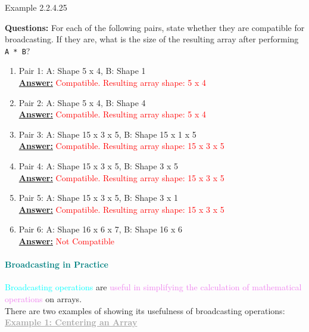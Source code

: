 \documentclass{book}
\begin{document}
\newpage
\begin{egBox}{Example 2.2.4.25}
    \raggedright
    \raggedright
    \textbf{Questions:} For each of the following pairs, state whether they are compatible for broadcasting. If they are, what is the size of the resulting array after performing \texttt{A * B}?\\

    \begin{enumerate}
        \item Pair 1: A: Shape 5 x 4, B: Shape 1 \\
            \underline{\textbf{Answer:}} \textcolor{red}{Compatible. Resulting array shape: 5 x 4}
        \item Pair 2: A: Shape 5 x 4, B: Shape 4 \\
            \underline{\textbf{Answer:}} \textcolor{red}{Compatible. Resulting array shape: 5 x 4}
        \item Pair 3: A: Shape 15 x 3 x 5, B: Shape 15 x 1 x 5 \\
            \underline{\textbf{Answer:}} \textcolor{red}{Compatible. Resulting array shape: 15 x 3 x 5}
        \item Pair 4: A: Shape 15 x 3 x 5, B: Shape 3 x 5 \\
            \underline{\textbf{Answer:}} \textcolor{red}{Compatible. Resulting array shape: 15 x 3 x 5}
        \item Pair 5: A: Shape 15 x 3 x 5, B: Shape 3 x 1 \\
            \underline{\textbf{Answer:}} \textcolor{red}{Compatible. Resulting array shape: 15 x 3 x 5}
        \item Pair 6: A: Shape 16 x 6 x 7, B: Shape 16 x 6 \\
            \underline{\textbf{Answer:}} \textcolor{red}{Not Compatible}
    \end{enumerate}
\end{egBox}
\textcolor{teal}{\paragraph{Broadcasting in Practice}}
\textcolor{cyan}{Broadcasting operations} are \textcolor{violet}{useful in simplifying the calculation of mathematical operations} on arrays. \\
There are two examples of showing its usefulness of broadcasting operations:\\
\vspace{2mm}
\textcolor{darkgray}{\underline{\textbf{Example 1: Centering an Array}}}\\
\end{document}
